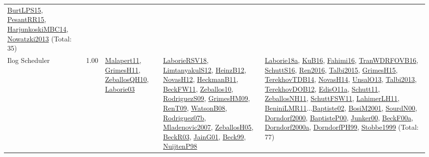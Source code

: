{\begin{longtable}{p{3cm}r>{\raggedright\arraybackslash}p{6cm}>{\raggedright\arraybackslash}p{6cm}>{\raggedright\arraybackslash}p{8cm}}
\hyperref[detail:BurtLPS15]{BurtLPS15}, \hyperref[detail:PesantRR15]{PesantRR15}, \hyperref[detail:HarjunkoskiMBC14]{HarjunkoskiMBC14}, \hyperref[detail:Nowatzki2013]{Nowatzki2013} (Total: 35)\\
\index{Ilog Scheduler}\index{CPSystems!Ilog Scheduler}Ilog Scheduler &  1.00 & \hyperref[detail:Malapert11]{Malapert11}, \hyperref[detail:GrimesH11]{GrimesH11}, \hyperref[detail:ZeballosQH10]{ZeballosQH10}, \hyperref[detail:Laborie03]{Laborie03} & \hyperref[detail:LaborieRSV18]{LaborieRSV18}, \hyperref[detail:LimtanyakulS12]{LimtanyakulS12}, \hyperref[detail:HeinzB12]{HeinzB12}, \hyperref[detail:NovasH12]{NovasH12}, \hyperref[detail:HeckmanB11]{HeckmanB11}, \hyperref[detail:BeckFW11]{BeckFW11}, \hyperref[detail:Zeballos10]{Zeballos10}, \hyperref[detail:RodriguezS09]{RodriguezS09}, \hyperref[detail:GrimesHM09]{GrimesHM09}, \hyperref[detail:RenT09]{RenT09}, \hyperref[detail:WatsonB08]{WatsonB08}, \hyperref[detail:Rodriguez07b]{Rodriguez07b}, \hyperref[detail:Mladenovic2007]{Mladenovic2007}, \hyperref[detail:ZeballosH05]{ZeballosH05}, \hyperref[detail:BeckR03]{BeckR03}, \hyperref[detail:JainG01]{JainG01}, \hyperref[detail:Beck99]{Beck99}, \hyperref[detail:NuijtenP98]{NuijtenP98} & \hyperref[detail:Laborie18a]{Laborie18a}, \hyperref[detail:KuB16]{KuB16}, \hyperref[detail:Fahimi16]{Fahimi16}, \hyperref[detail:TranWDRFOVB16]{TranWDRFOVB16}, \hyperref[detail:SchuttS16]{SchuttS16}, \hyperref[detail:Ren2016]{Ren2016}, \hyperref[detail:Talbi2015]{Talbi2015}, \hyperref[detail:GrimesH15]{GrimesH15}, \hyperref[detail:TerekhovTDB14]{TerekhovTDB14}, \hyperref[detail:NovasH14]{NovasH14}, \hyperref[detail:UnsalO13]{UnsalO13}, \hyperref[detail:Talbi2013]{Talbi2013}, \hyperref[detail:TerekhovDOB12]{TerekhovDOB12}, \hyperref[detail:EdisO11a]{EdisO11a}, \hyperref[detail:Schutt11]{Schutt11}, \hyperref[detail:ZeballosNH11]{ZeballosNH11}, \hyperref[detail:SchuttFSW11]{SchuttFSW11}, \hyperref[detail:LahimerLH11]{LahimerLH11}, \hyperref[detail:BeniniLMR11]{BeniniLMR11}...\hyperref[detail:Baptiste02]{Baptiste02}, \hyperref[detail:BosiM2001]{BosiM2001}, \hyperref[detail:SourdN00]{SourdN00}, \hyperref[detail:Dorndorf2000]{Dorndorf2000}, \hyperref[detail:BaptisteP00]{BaptisteP00}, \hyperref[detail:Junker00]{Junker00}, \hyperref[detail:BeckF00a]{BeckF00a}, \hyperref[detail:Dorndorf2000a]{Dorndorf2000a}, \hyperref[detail:DorndorfPH99]{DorndorfPH99}, \hyperref[detail:Stobbe1999]{Stobbe1999} (Total: 77)\\

\end{longtable}}

